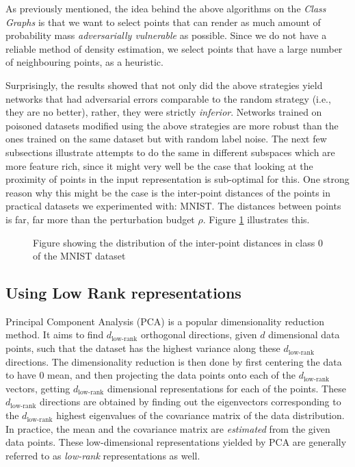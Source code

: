 \documentclass{ociamthesis}
\begin{document}
As previously mentioned, the idea behind the above algorithms on the \emph{Class
Graphs} is that we want to select points that can render as much amount of
probability mass \emph{adversarially vulnerable} as possible. Since we do not
have a reliable method of density estimation, we select points that have a large
number of neighbouring points, as a heuristic.


Surprisingly, the results showed that not only did the above strategies yield
networks that had adversarial errors comparable to the random strategy (i.e.,
they are no better), rather, they were strictly \emph{inferior}. Networks
trained on poisoned datasets modified using the above strategies are more robust
than the ones trained on the same dataset but with random label noise. The next
few subsections illustrate attempts to do the same in different subspaces which
are more feature rich, since it might very well be the case that looking at the
proximity of points in the input representation is sub-optimal for this. One
strong reason why this might be the case is the inter-point distances of the
points in practical datasets we experimented with: MNIST. The distances between
points is far, far more than the perturbation budget $\rho$. Figure
\ref{fig:inter-point-distances} illustrates this.

\begin{figure}
    \caption{Figure showing the distribution of the inter-point distances in
    class 0 of the MNIST dataset}
    \label{fig:inter-point-distances}
\end{figure}

\subsection{Using Low Rank representations}
Principal Component Analysis (PCA) is a popular dimensionality reduction method.
It aims to find $d_\text{low-rank}$ orthogonal directions, given $d$ dimensional
data points, such that the dataset has the highest variance along these
$d_\text{low-rank}$ directions. The dimensionality reduction is then done by
first centering the data to have $0$ mean, and then projecting the data points
onto each of the $d_\text{low-rank}$ vectors, getting $d_\text{low-rank}$
dimensional representations for each of the points. These $d_\text{low-rank}$
directions are obtained by finding out the eigenvectors corresponding to the
$d_\text{low-rank}$ highest eigenvalues of the covariance matrix of the data
distribution. In practice, the mean and the covariance matrix are
\emph{estimated} from the given data points. These low-dimensional
representations yielded by PCA are generally referred to as \emph{low-rank}
representations as well.
\end{document}
